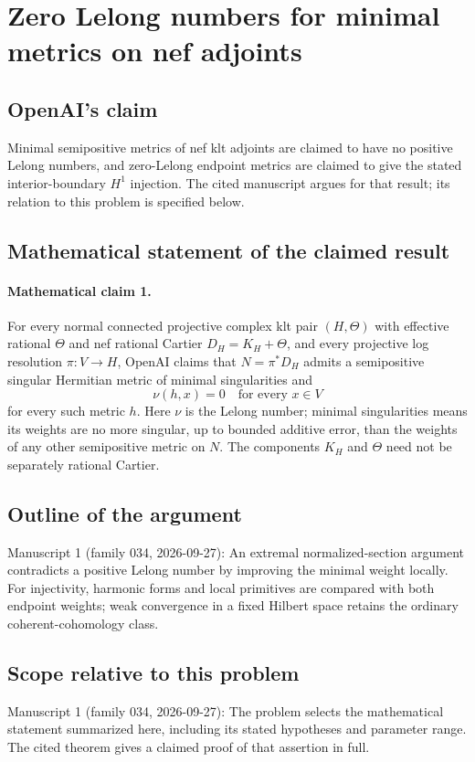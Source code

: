 \documentclass[11pt]{article}
\begin{document}
\section*{Zero Lelong numbers for minimal metrics on nef adjoints}

\subsection{OpenAI's claim}
Minimal semipositive metrics of nef klt adjoints are claimed to have no positive Lelong numbers, and zero-Lelong endpoint metrics are claimed to give the stated interior-boundary $H^1$ injection. The cited manuscript argues for that result; its relation to this problem is specified below.

\subsection{Mathematical statement of the claimed result}
\paragraph{Mathematical claim 1.} For every normal connected projective complex klt pair $(H,\Theta)$ with effective rational $\Theta$ and nef rational Cartier $D_H=K_H+\Theta$, and every projective log resolution $\pi:V\to H$, OpenAI claims that $N=\pi^*D_H$ admits a semipositive singular Hermitian metric of minimal singularities and
\[
\nu(h,x)=0\quad\text{for every }x\in V
\]
for every such metric $h$. Here $\nu$ is the Lelong number; minimal singularities means its weights are no more singular, up to bounded additive error, than the weights of any other semipositive metric on $N$. The components $K_H$ and $\Theta$ need not be separately rational Cartier.

\subsection{Outline of the argument}
Manuscript 1 (family 034, 2026-09-27): An extremal normalized-section argument contradicts a positive Lelong number by improving the minimal weight locally. For injectivity, harmonic forms and local primitives are compared with both endpoint weights; weak convergence in a fixed Hilbert space retains the ordinary coherent-cohomology class.

\subsection{Scope relative to this problem}
Manuscript 1 (family 034, 2026-09-27): The problem selects the mathematical statement summarized here, including its stated hypotheses and parameter range. The cited theorem gives a claimed proof of that assertion in full.
\end{document}
